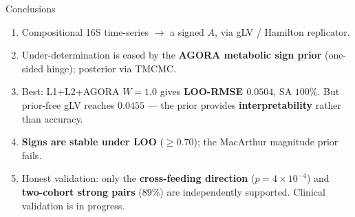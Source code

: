 \documentclass[
  ignorenonframetext,
  aspectratio=169,
]{beamer}
\providecommand{\tightlist}{%
  \setlength{\itemsep}{0pt}\setlength{\parskip}{0pt}}
\begin{document}
\begin{frame}{Conclusions}
\protect\hypertarget{conclusions}{}
\begin{enumerate}
\tightlist
\item
  Compositional 16S time-series \(\to\) a signed \(A\), via gLV /
  Hamilton replicator.
\item
  Under-determination is eased by the \textbf{AGORA metabolic sign
  prior} (one-sided hinge); posterior via TMCMC.
\item
  Best: L1+L2+AGORA \(W=1.0\) gives \textbf{LOO-RMSE \(0.0504\)}, SA
  \(100\%\). But prior-free gLV reaches \(0.0455\) --- the prior
  provides \textbf{interpretability} rather than accuracy.
\item
  \textbf{Signs are stable under LOO} (\(\geq0.70\)); the MacArthur
  magnitude prior fails.
\item
  Honest validation: only the \textbf{cross-feeding direction}
  (\(p=4\times10^{-4}\)) and \textbf{two-cohort strong pairs} (\(89\%\))
  are independently supported. Clinical validation is in progress.
\end{enumerate}
\end{frame}
\end{document}
